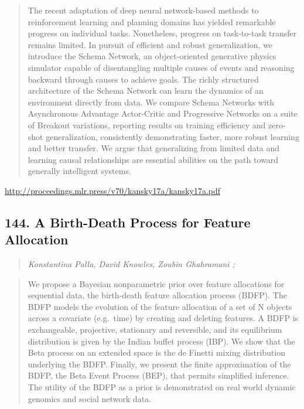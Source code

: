 \documentclass{article}
\begin{document}
\begin{quote}
    The recent adaptation of deep neural network-based methods to reinforcement learning and planning domains has yielded remarkable progress on individual tasks. Nonetheless, progress on task-to-task transfer remains limited. In pursuit of efficient and robust generalization, we introduce the Schema Network, an object-oriented generative physics simulator capable of disentangling multiple causes of events and reasoning backward through causes to achieve goals. The richly structured architecture of the Schema Network can learn the dynamics of an environment directly from data. We compare Schema Networks with Asynchronous Advantage Actor-Critic and Progressive Networks on a suite of Breakout variations, reporting results on training efficiency and zero-shot generalization, consistently demonstrating faster, more robust learning and better transfer. We argue that generalizing from limited data and learning causal relationships are essential abilities on the path toward generally intelligent systems.  
\end{quote}

\href{http://proceedings.mlr.press/v70/kansky17a/kansky17a.pdf}{http://proceedings.mlr.press/v70/kansky17a/kansky17a.pdf}

\subsection{144. A Birth-Death Process for Feature Allocation}

\begin{quote}
\footnotesize{\textit{Konstantina Palla, David Knowles, Zoubin Ghahramani ;}}

\end{quote}

\begin{quote}
    We propose a Bayesian nonparametric prior over feature allocations for sequential data, the birth-death feature allocation process (BDFP). The BDFP models the evolution of the feature allocation of a set of N objects across a covariate (e.g.~time) by creating and deleting features. A BDFP is exchangeable, projective, stationary and reversible, and its equilibrium distribution is given by the Indian buffet process (IBP). We show that the Beta process on an extended space is the de Finetti mixing distribution underlying the BDFP. Finally, we present the finite approximation of the BDFP, the Beta Event Process (BEP), that permits simplified inference. The utility of the BDFP as a prior is demonstrated on real world dynamic genomics and social network data.  
\end{quote}
\end{document}
